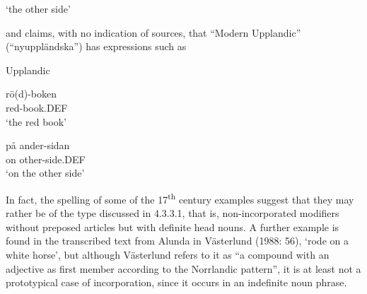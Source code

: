\glt  ‘the other side’

\z

and claims, with no indication of sources, that “Modern Upplandic” (“nyupp\-ländska”) has expressions such as


\item 

Upplandic



\item 


 \ea\label{}
\gll rö(d)-boken\\


red-book.DEF\\

\glt ‘the red book’

\z

\item 


 \ea\label{}
\gll på  ander-sidan\\


on  other-side.DEF\\

\glt  ‘on the other side’

\z

In fact, the spelling of some of the 17\textsuperscript{th} century examples suggest that they may rather be of the type discussed in 4.3.3.1, that is, non-incorporated modifiers without preposed articles but with definite head nouns. A further example is found in the transcribed text from Alunda in Västerlund (1988: 56),  ‘rode on a white horse’, but although Västerlund refers to it as “a compound with an adjective as first member according to the Norrlandic pattern”, it is at least not a prototypical case of incorporation, since it occurs in an indefinite noun phrase.

